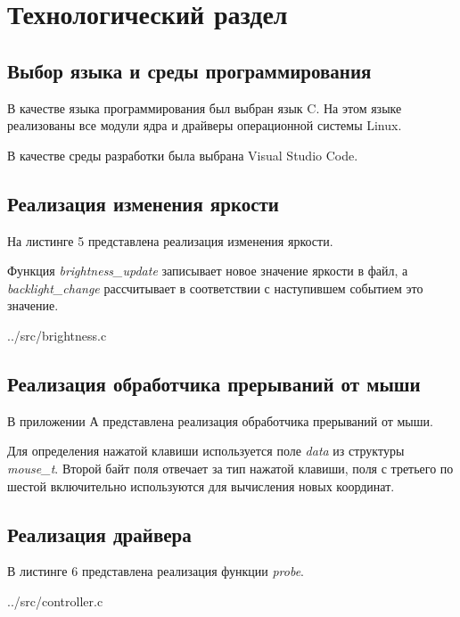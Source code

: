 \section{Технологический раздел}

\subsection{Выбор языка и среды программирования}
В качестве языка программирования был выбран язык C. 
На этом языке реализованы все модули ядра и драйверы операционной системы Linux.

В качестве среды разработки была выбрана Visual Studio Code. 

\subsection{Реализация изменения яркости}
На листинге 5 представлена реализация изменения яркости.

Функция \textit{brightness\_update} записывает новое значение яркости в файл, а \textit{backlight\_change} рассчитывает в соответствии с наступившем событием это значение.

\FloatBarrier
\begin{lstinputlisting}[language=C, caption=Реализация изменения яркости, linerange = {37-55},
	basicstyle=\footnotesize\ttfamily, frame=single, breaklines=true]{../src/brightness.c}
\end{lstinputlisting}
\FloatBarrier

\subsection{Реализация обработчика прерываний от мыши}
В приложении А представлена реализация обработчика прерываний от мыши.

Для определения нажатой клавиши используется поле \textit{data} из структуры \textit{mouse\_t}. 
Второй байт поля отвечает за тип нажатой клавиши, поля с третьего по шестой включительно используются для вычисления новых координат.

\subsection{Реализация драйвера}
В листинге 6 представлена реализация функции \textit{probe}.

\FloatBarrier
\begin{lstinputlisting}[language=C, caption=Реализация функции probe, linerange = {126-206},
	basicstyle=\footnotesize\ttfamily, frame=single, breaklines=true]{../src/controller.c}
\end{lstinputlisting}
\FloatBarrier


